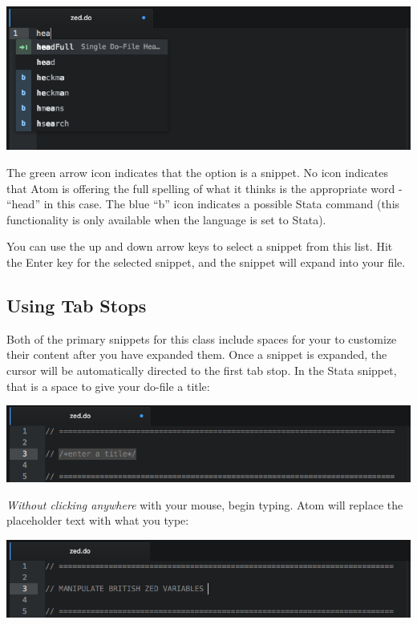 \documentclass[]{book}
\theoremstyle{definition}
\theoremstyle{definition}
\theoremstyle{definition}
\theoremstyle{remark}
\begin{document}
\includegraphics[width=1\linewidth]{images/atomSnippet}

The green arrow icon indicates that the option is a snippet. No icon
indicates that Atom is offering the full spelling of what it thinks is
the appropriate word - ``head'' in this case. The blue ``b'' icon
indicates a possible Stata command (this functionality is only available
when the language is set to Stata).

You can use the up and down arrow keys to select a snippet from this
list. Hit the Enter key for the selected snippet, and the snippet will
expand into your file.

\subsection{Using Tab Stops}\label{using-tab-stops}

Both of the primary snippets for this class include spaces for your to
customize their content after you have expanded them. Once a snippet is
expanded, the cursor will be automatically directed to the first tab
stop. In the Stata snippet, that is a space to give your do-file a
title:

\includegraphics[width=1\linewidth]{images/atomHead}

\emph{Without clicking anywhere} with your mouse, begin typing. Atom
will replace the placeholder text with what you type:

\includegraphics[width=1\linewidth]{images/atomHead2}
\end{document}
